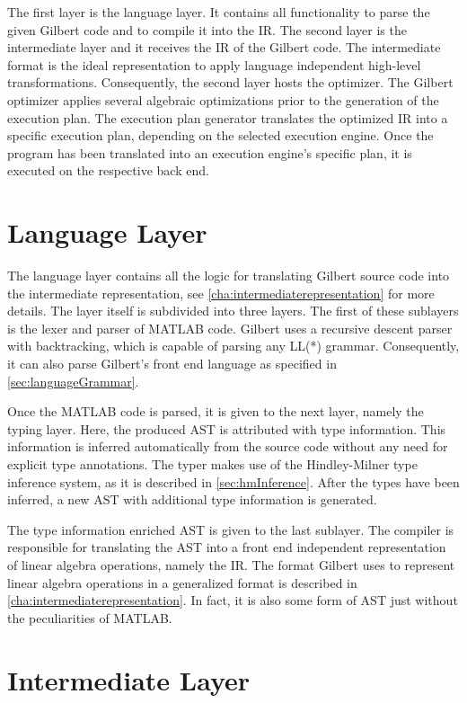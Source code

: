 The first layer is the language layer.
It contains all functionality to parse the given Gilbert code and to compile it into the IR.
The second layer is the intermediate layer and it receives the IR of the Gilbert code.
The intermediate format is the ideal representation to apply language independent high-level transformations.
Consequently, the second layer hosts the optimizer.
The Gilbert optimizer applies several algebraic optimizations prior to the generation of the execution plan.
The execution plan generator translates the optimized IR into a specific execution plan, depending on the selected execution engine.
Once the program has been translated into an execution engine's specific plan, it is executed on the respective back end.

\section{Language Layer}

The language layer contains all the logic for translating Gilbert source code into the intermediate representation, see \cref{cha:intermediaterepresentation} for more details.
The layer itself is subdivided into three layers.
The first of these sublayers is the lexer and parser of MATLAB code.
Gilbert uses a recursive descent parser with backtracking, which is capable of parsing any LL(*) grammar.
Consequently, it can also parse Gilbert's front end language as specified in \cref{sec:languageGrammar}.

Once the MATLAB code is parsed, it is given to the next layer, namely the typing layer.
Here, the produced AST is attributed with type information.
This information is inferred automatically from the source code without any need for explicit type annotations.
The typer makes use of the Hindley-Milner type inference system, as it is described in \cref{sec:hmInference}.
After the types have been inferred, a new AST with additional type information is generated.

The type information enriched AST is given to the last sublayer.
The compiler is responsible for translating the AST into a front end independent representation of linear algebra operations, namely the IR.
The format Gilbert uses to represent linear algebra operations in a generalized format is described in \cref{cha:intermediaterepresentation}.
In fact, it is also some form of AST just without the peculiarities of MATLAB.

\section{Intermediate Layer}

